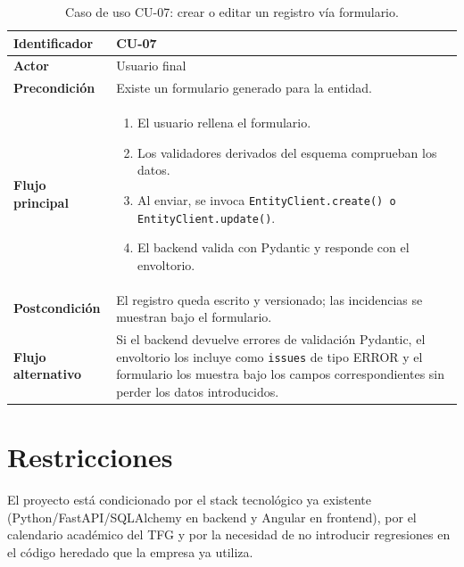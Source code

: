 \begin{table}[H]
\caption{Caso de uso CU-07: crear o editar un registro vía formulario.}
\label{tab:cu07}
\centering
\begin{tabular}{|l|p{9cm}|}
\hline
\textbf{Identificador} & CU-07 \\ \hline
\textbf{Actor} & Usuario final \\ \hline
\textbf{Precondición} & Existe un formulario generado para la entidad. \\ \hline
\textbf{Flujo principal} &
\begin{enumerate}
  \item El usuario rellena el formulario.
  \item Los validadores derivados del esquema comprueban los datos.
  \item Al enviar, se invoca \texttt{EntityClient.create() o EntityClient.update()}.
  \item El backend valida con Pydantic y responde con el envoltorio.
\end{enumerate} \\ \hline
\textbf{Postcondición} & El registro queda escrito y versionado; las
incidencias se muestran bajo el formulario. \\ \hline
\textbf{Flujo alternativo} & Si el backend devuelve errores de validación
Pydantic, el envoltorio los incluye como \texttt{issues} de tipo ERROR y el
formulario los muestra bajo los campos correspondientes sin perder los datos
introducidos. \\ \hline
\end{tabular}
\end{table}

\section{Restricciones}
El proyecto está condicionado por el stack tecnológico ya existente
(Python/FastAPI/SQLAlchemy en backend y Angular en frontend), por el
calendario académico del TFG y por la necesidad de no introducir regresiones
en el código heredado que la empresa ya utiliza.
